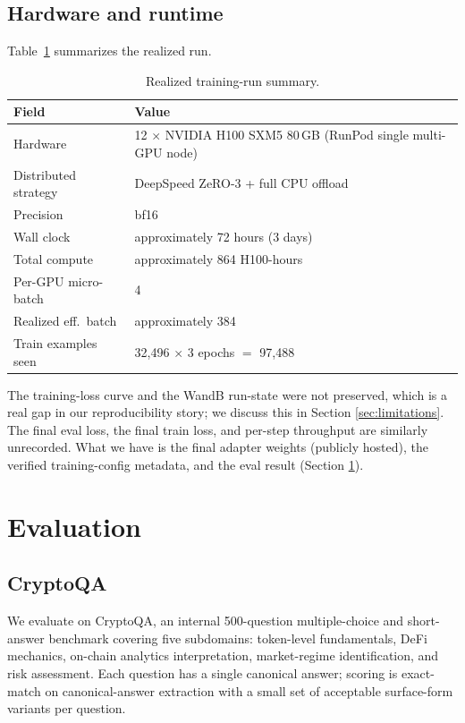 \documentclass[10pt,letterpaper]{article}
\begin{document}
\subsection{Hardware and runtime}

Table~\ref{tab:run} summarizes the realized run.

\begin{table}[H]
\centering
\small
\caption{Realized training-run summary.}
\label{tab:run}
\begin{tabular}{ll}
\toprule
\textbf{Field} & \textbf{Value} \\
\midrule
Hardware           & 12 $\times$ NVIDIA H100 SXM5 80\,GB (RunPod single multi-GPU node) \\
Distributed strategy & DeepSpeed ZeRO-3 + full CPU offload \\
Precision          & bf16 \\
Wall clock         & approximately 72 hours (3 days) \\
Total compute      & approximately 864 H100-hours \\
Per-GPU micro-batch & 4 \\
Realized eff.\ batch & approximately 384 \\
Train examples seen & 32{,}496 $\times$ 3 epochs $=$ 97{,}488 \\
\bottomrule
\end{tabular}
\end{table}

The training-loss curve and the WandB run-state were not preserved, which is a real gap in our reproducibility story; we discuss this in Section \ref{sec:limitations}. The final eval loss, the final train loss, and per-step throughput are similarly unrecorded. What we have is the final adapter weights (publicly hosted), the verified training-config metadata, and the eval result (Section \ref{sec:eval}).

\section{Evaluation}
\label{sec:eval}

\subsection{CryptoQA}

We evaluate on CryptoQA, an internal 500-question multiple-choice and short-answer benchmark covering five subdomains: token-level fundamentals, DeFi mechanics, on-chain analytics interpretation, market-regime identification, and risk assessment. Each question has a single canonical answer; scoring is exact-match on canonical-answer extraction with a small set of acceptable surface-form variants per question.
\end{document}
